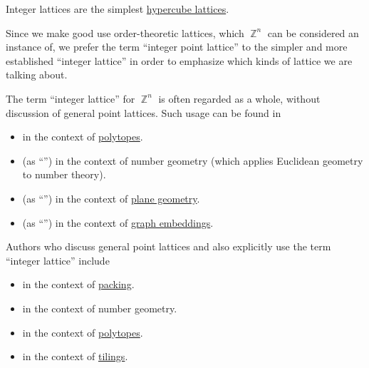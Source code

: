 \begin{comments}
  \item Integer lattices are the simplest \hyperref[def:hypercubic_point_lattice]{hypercube lattices}.

  \item Since we make good use order-theoretic lattices, which \( \BbbZ^n \) can be considered an instance of, we prefer the term \enquote{integer point lattice} to the simpler and more established \enquote{integer lattice} in order to emphasize which kinds of lattice we are talking about.

  \item The term \enquote{integer lattice} for \( \BbbZ^n \) is often regarded as a whole, without discussion of general point lattices. Such usage can be found in
  \begin{itemize}
    \item \Textcite[296]{Aluffi2009Algebra} in the context of \hyperref[def:polytope]{polytopes}.
    \item \Textcite[92]{ГашковЧубариков2005СложностьВычисления} (as \enquote{}) in the context of number geometry (which applies Euclidean geometry to number theory).
    \item \Textcite[256]{БолтянскийЯглом1966Равносоставленость} (as \enquote{}) in the context of \hyperref[def:euclidean_plane]{plane geometry}.
    \item \Textcite[348]{Зыков2004ТеорияГрафов} (as \enquote{}) in the context of \hyperref[def:graph_geometric_realization/embedding]{graph embeddings}.
  \end{itemize}

  Authors who discuss general point lattices and also explicitly use the term \enquote{integer lattice} include
  \begin{itemize}
    \item \Textcite[106]{ConwaySloane1998SpherePackings} in the context of \hyperref[def:topological_space_packing]{packing}.
    \item \Textcite[322]{Cassels1997NumberGeometry} in the context of number geometry.
    \item \Textcite[310]{Gruber2007ConvexAndDiscreteGeometry} in the context of \hyperref[def:polytope]{polytopes}.
    \item \Textcite[fig. 3.8.5]{GrünbaumShephard1987TilingsAndPatterns} in the context of \hyperref[def:topological_space_tiling]{tilings}.
  \end{itemize}
\end{comments}

